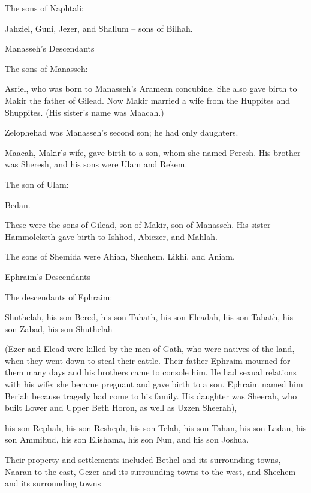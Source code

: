 {\par }{\PP {}The sons
of Naphtali:
\par }{\PP Jahziel,
Guni,
Jezer,
and Shallum –
sons
of Bilhah.
\par }{\SH Manasseh’s Descendants
\par }{\PP {}The sons
of Manasseh:
\par }{\PP Asriel,
who
was born
to Manasseh’s Aramean
concubine.
She also gave birth
to Makir
the father
of Gilead.
Now Makir
married
a wife
from the Huppites
and Shuppites.
(His sister’s
name
was Maacah.)
\par }{\PP Zelophehad
was Manasseh’s second
son; he
had only
daughters.
\par }{\PP {}Maacah,
Makir’s
wife,
gave birth
to a son,
whom she named
Peresh.
His brother
was Sheresh,
and his sons
were Ulam
and Rekem.
\par }{\PP {}The son
of Ulam:
\par }{\PP Bedan.
\par }{\PP These
were the sons
of Gilead,
son
of Makir,
son
of Manasseh.
His sister
Hammoleketh
gave birth
to Ishhod,
Abiezer,
and Mahlah.
\par }{\PP {}The sons
of Shemida
were
Ahian,
Shechem,
Likhi,
and Aniam.
\par }{\SH Ephraim’s Descendants
\par }{\PP {}The descendants
of Ephraim:
\par }{\PP Shuthelah,
his son
Bered,
his son
Tahath,
his son
Eleadah,
his son
Tahath,
his son
Zabad,
his son
Shuthelah
\par }{\PP (Ezer
and Elead
were killed
by the men
of Gath,
who were natives
of the land,
when
they went down
to steal
their cattle.
Their father
Ephraim
mourned
for them many
days
and his brothers
came
to console him.
He had sexual relations with
his wife;
she became pregnant
and gave birth
to a son.
Ephraim named
him Beriah
because
tragedy
had come
to his family.
His daughter
was Sheerah,
who built
Lower
and Upper
Beth Horon,
as well as Uzzen Sheerah),
\par }{\PP {}his son
Rephah,
his son
Resheph,
his son
Telah,
his son
Tahan,
his son
Ladan,
his son
Ammihud,
his son
Elishama,
his son
Nun,
and his son
Joshua.
\par }{\PP {}Their property
and settlements
included Bethel
and its surrounding towns,
Naaran
to the east,
Gezer
and its surrounding towns
to the west,
and Shechem
and its surrounding towns
}
